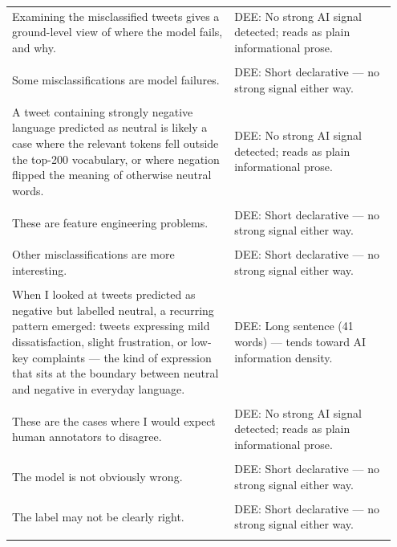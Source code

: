 \documentclass[11pt]{article}
\begin{document}
\begin{longtable}{|p{0.55\linewidth}|p{0.40\linewidth}|}
\hline
\rule{0pt}{3.5cm} & \\
\hline
Examining the misclassified tweets gives a ground-level view of where the model fails, and why. & DEE: No strong AI signal detected; reads as plain informational prose. \\[2pt]
\hline
\rule{0pt}{3.5cm} & \\
\hline
Some misclassifications are model failures. & DEE: Short declarative --- no strong signal either way. \\[2pt]
\hline
\rule{0pt}{3.5cm} & \\
\hline
A tweet containing strongly negative language predicted as neutral is likely a case where the relevant tokens fell outside the top-200 vocabulary, or where negation flipped the meaning of otherwise neutral words. & DEE: No strong AI signal detected; reads as plain informational prose. \\[2pt]
\hline
\rule{0pt}{3.5cm} & \\
\hline
These are feature engineering problems. & DEE: Short declarative --- no strong signal either way. \\[2pt]
\hline
\rule{0pt}{3.5cm} & \\
\hline
Other misclassifications are more interesting. & DEE: Short declarative --- no strong signal either way. \\[2pt]
\hline
\rule{0pt}{3.5cm} & \\
\hline
When I looked at tweets predicted as negative but labelled neutral, a recurring pattern emerged: tweets expressing mild dissatisfaction, slight frustration, or low-key complaints --- the kind of expression that sits at the boundary between neutral and negative in everyday language. & DEE: Long sentence (41 words) --- tends toward AI information density. \\[2pt]
\hline
\rule{0pt}{3.5cm} & \\
\hline
These are the cases where I would expect human annotators to disagree. & DEE: No strong AI signal detected; reads as plain informational prose. \\[2pt]
\hline
\rule{0pt}{3.5cm} & \\
\hline
The model is not obviously wrong. & DEE: Short declarative --- no strong signal either way. \\[2pt]
\hline
\rule{0pt}{3.5cm} & \\
\hline
The label may not be clearly right. & DEE: Short declarative --- no strong signal either way. \\[2pt]
\hline
\rule{0pt}{3.5cm} & \\

\end{longtable}
\end{document}
